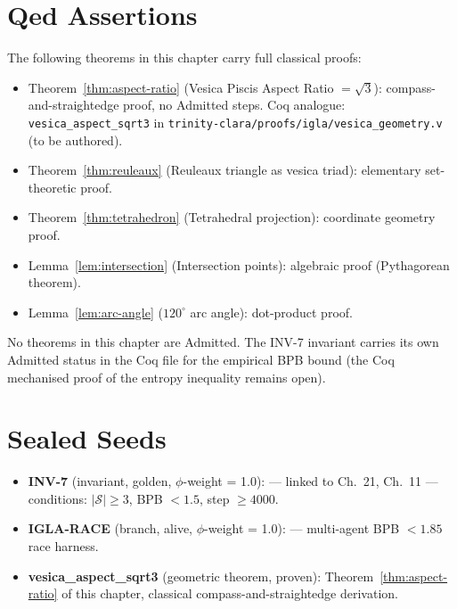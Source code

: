 \section{Qed Assertions}\label{sec:ch11-qed}

The following theorems in this chapter carry full classical proofs:

\begin{itemize}
\item Theorem~\ref{thm:aspect-ratio} (Vesica Piscis Aspect Ratio \(= \sqrt{3}\)):
  compass-and-straightedge proof, no Admitted steps.
  Coq analogue: \texttt{vesica\_aspect\_sqrt3} in
  \texttt{trinity-clara/proofs/igla/vesica\_geometry.v} (to be authored).
\item Theorem~\ref{thm:reuleaux} (Reuleaux triangle as vesica triad):
  elementary set-theoretic proof.
\item Theorem~\ref{thm:tetrahedron} (Tetrahedral projection):
  coordinate geometry proof.
\item Lemma~\ref{lem:intersection} (Intersection points):
  algebraic proof (Pythagorean theorem).
\item Lemma~\ref{lem:arc-angle} (\(120^\circ\) arc angle): dot-product proof.
\end{itemize}

No theorems in this chapter are Admitted.
The INV-7 invariant carries its own Admitted status in the Coq file
for the empirical BPB bound (the Coq mechanised proof of the entropy
inequality remains open).


\section{Sealed Seeds}\label{sec:ch11-seeds}

\begin{itemize}
\item \textbf{INV-7} (invariant, golden, \(\phi\)-weight = 1.0):
  --- linked to Ch.~21, Ch.~11 ---
  conditions: \(|\mathcal{S}| \geq 3\), BPB \(< 1.5\), step \(\geq 4000\).
\item \textbf{IGLA-RACE} (branch, alive, \(\phi\)-weight = 1.0):
   ---
  multi-agent BPB \(< 1.85\) race harness.
\item \textbf{vesica\_aspect\_sqrt3} (geometric theorem, proven):
  Theorem~\ref{thm:aspect-ratio} of this chapter,
  classical compass-and-straightedge derivation.
\end{itemize}

